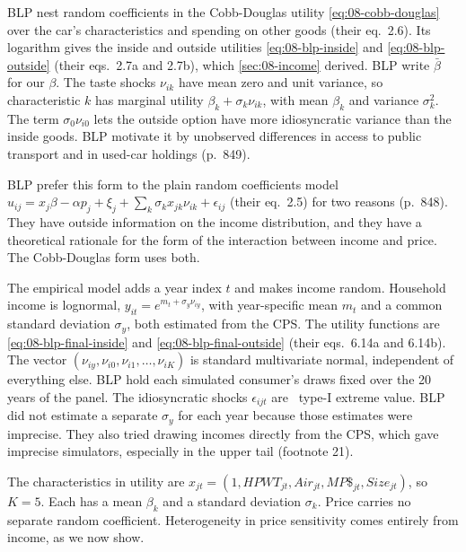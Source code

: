 BLP nest random coefficients in the Cobb-Douglas utility \eqref{eq:08-cobb-douglas} over the car's
characteristics and spending on other goods (their eq.~2.6). Its logarithm gives the inside and outside
utilities \eqref{eq:08-blp-inside} and \eqref{eq:08-blp-outside} (their eqs.~2.7a and 2.7b), which
\cref{sec:08-income} derived. BLP write $\bar\beta$ for our $\beta$. The taste shocks $\nu_{ik}$ have mean
zero and unit variance, so characteristic $k$ has marginal utility $\beta_k+\sigma_k\nu_{ik}$, with mean
$\beta_k$ and variance $\sigma_k^2$. The term $\sigma_0\nu_{i0}$ lets the outside option have more
idiosyncratic variance than the inside goods. BLP motivate it by unobserved differences in access to
public transport and in used-car holdings (p.~849).

BLP prefer this form to the plain random coefficients model
$u_{ij}=x_j\beta-\alpha p_j+\xi_j+\sum_k\sigma_kx_{jk}\nu_{ik}+\epsilon_{ij}$ (their eq.~2.5) for two
reasons (p.~848). They have outside information on the income distribution, and they have a
theoretical rationale for the form of the interaction between income and price. The Cobb-Douglas form
uses both.

The empirical model adds a year index $t$ and makes income random. Household income is lognormal,
$y_{it}=e^{m_t+\sigma_y\nu_{iy}}$, with year-specific mean $m_t$ and a common standard deviation
$\sigma_y$, both estimated from the CPS. The utility functions are \eqref{eq:08-blp-final-inside} and
\eqref{eq:08-blp-final-outside} (their eqs.~6.14a and 6.14b). The vector
$(\nu_{iy},\nu_{i0},\nu_{i1},\dots,\nu_{iK})$ is standard multivariate normal, independent of everything
else. BLP hold each simulated consumer's draws fixed over the 20 years of the panel. The idiosyncratic
shocks $\epsilon_{ijt}$ are \iid\ type-I extreme value. BLP did not estimate a separate $\sigma_y$ for each
year because those estimates were imprecise. They also tried drawing incomes directly from the CPS, which
gave imprecise simulators, especially in the upper tail (footnote 21).

The characteristics in utility are $x_{jt}=(1,\mathit{HPWT}_{jt},\mathit{Air}_{jt},
\mathit{MP\$}_{jt},\mathit{Size}_{jt})$, so $K=5$. Each has a mean $\beta_k$ and a standard deviation
$\sigma_k$. Price carries no separate random coefficient. Heterogeneity in price sensitivity comes
entirely from income, as we now show.


